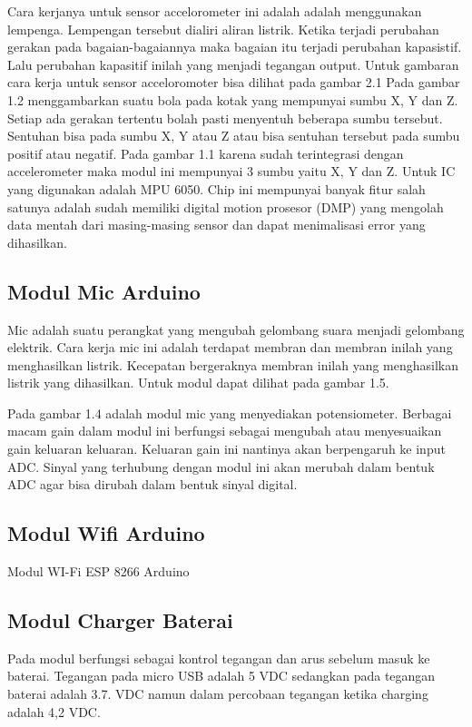 \documentclass[11pt]{article}
\begin{document}
Cara kerjanya untuk sensor accelorometer ini adalah  adalah menggunakan lempenga.
Lempengan tersebut dialiri aliran listrik.
Ketika terjadi perubahan gerakan pada bagaian-bagaiannya maka bagaian itu terjadi perubahan kapasistif.
Lalu perubahan kapasitif inilah yang menjadi tegangan output.
Untuk gambaran cara kerja untuk sensor acceloromoter bisa dilihat pada gambar 2.1
Pada gambar 1.2 menggambarkan suatu bola pada kotak yang mempunyai sumbu X, Y dan Z. Setiap ada gerakan tertentu bolah pasti menyentuh beberapa sumbu tersebut. Sentuhan bisa pada sumbu X, Y atau Z atau bisa sentuhan tersebut pada sumbu positif atau negatif.
Pada gambar 1.1 karena sudah terintegrasi dengan accelerometer maka modul ini mempunyai 3 sumbu yaitu X, Y dan Z.
Untuk IC yang digunakan adalah MPU 6050.
Chip ini mempunyai banyak fitur salah satunya adalah sudah memiliki digital motion prosesor (DMP) yang mengolah data mentah dari masing-masing sensor dan dapat menimalisasi error yang dihasilkan.

\subsection{Modul Mic Arduino}
Mic adalah suatu perangkat yang mengubah gelombang suara menjadi gelombang elektrik.
Cara kerja mic ini adalah  terdapat membran dan membran inilah yang menghasilkan listrik.
Kecepatan bergeraknya membran inilah yang menghasilkan listrik yang dihasilkan.
Untuk modul dapat dilihat pada gambar 1.5.

Pada gambar 1.4 adalah modul mic yang menyediakan potensiometer.
Berbagai macam gain dalam modul ini berfungsi sebagai mengubah atau menyesuaikan gain keluaran keluaran.
Keluaran gain ini nantinya akan berpengaruh ke input ADC.
Sinyal yang terhubung dengan modul ini akan merubah dalam bentuk ADC agar bisa dirubah dalam bentuk sinyal digital.

\subsection{Modul Wifi Arduino}
Modul WI-Fi ESP 8266 Arduino

\subsection{Modul Charger Baterai}
Pada modul berfungsi sebagai kontrol tegangan dan arus sebelum masuk ke baterai.
Tegangan pada micro USB adalah 5 VDC sedangkan pada tegangan  baterai adalah 3.7.
VDC namun dalam percobaan tegangan ketika charging adalah 4,2 VDC.
\end{document}
